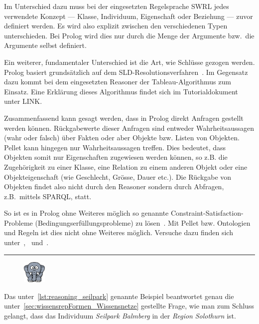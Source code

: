Im Unterschied dazu muss bei der eingesetzten Regelsprache SWRL jedes verwendete Konzept --- Klasse, Individuum, Eigenschaft oder Beziehung --- zuvor definiert werden. Es wird also explizit zwischen den verschiedenen Typen unterschieden. Bei Prolog wird dies nur durch die Menge der Argumente bzw.\ die Argumente selbst definiert.

Ein weiterer, fundamentaler Unterschied ist die Art, wie Schlüsse gezogen werden. Prolog basiert grundsätzlich auf dem SLD-Resolutionsverfahren~\citep[Details siehe][Seite 68]{laemmel}. Im Gegensatz dazu kommt bei dem eingesetzten Reasoner der Tableau-Algorithmus zum Einsatz. Eine Erklärung dieses Algorithmus findet sich im Tutorialdokument unter LINK.\@

Zusammenfassend kann gesagt werden, dass in Prolog direkt Anfragen gestellt werden können. Rückgabewerte dieser Anfragen sind entweder Wahrheitsaussagen (wahr oder falsch) über Fakten oder aber Objekte bzw. Listen von Objekten. Pellet kann hingegen nur Wahrheitsaussagen treffen. Dies bedeutet, dass Objekten somit nur Eigenschaften zugewiesen werden können, so z.B. die Zugehörigkeit zu einer Klasse, eine Relation zu einem anderen Objekt oder eine Objekteigenschaft (wie Geschlecht, Grösse, Dauer etc.). Die Rückgabe von Objekten findet also nicht durch den Reasoner sondern durch Abfragen, z.B.\ mittels SPARQL, statt.

So ist es in Prolog ohne Weiteres möglich so genannte Constraint-Satisfaction-Probleme (Bedingungserfüllungsprobleme) zu lösen~\citep[Details siehe][Seite 148]{laemmel}. Mit Pellet bzw. Ontologien und Regeln ist dies nicht ohne Weiteres möglich. Versuche dazu finden sich unter~\citet{xiong2008constraint},~\citet{staab2006constraint} und~\citet{bramer2007constraint}.

\noindent\rule[1ex]{\textwidth}{1pt}
\begin{figure}
    \vspace{-12pt}
    \includegraphics[width=0.1\textwidth]{bilder/elephant.png}
\end{figure}
Das unter~\ref{lst:reasoning_seilpark} genannte Beispiel beantwortet genau die unter~\ref{sec:wissensrepFormen_Wissensnetze} gestellte Frage, wie man zum Schluss gelangt, dass das Individuum \textit{Seilpark Balmberg} in der \textit{Region} \textit{Solothurn} ist.

